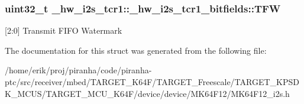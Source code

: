 \subsubsection[{\texorpdfstring{T\+FW}{TFW}}]{\setlength{\rightskip}{0pt plus 5cm}uint32\+\_\+t \+\_\+hw\+\_\+i2s\+\_\+tcr1\+::\+\_\+hw\+\_\+i2s\+\_\+tcr1\+\_\+bitfields\+::\+T\+FW}\hypertarget{struct__hw__i2s__tcr1_1_1__hw__i2s__tcr1__bitfields_a359dd879434cf79a67e83822231dbafa}{}\label{struct__hw__i2s__tcr1_1_1__hw__i2s__tcr1__bitfields_a359dd879434cf79a67e83822231dbafa}
\mbox{[}2\+:0\mbox{]} Transmit F\+I\+FO Watermark 

The documentation for this struct was generated from the following file\+:\begin{DoxyCompactItemize}
\item 
/home/erik/proj/piranha/code/piranha-\/ptc/src/receiver/mbed/\+T\+A\+R\+G\+E\+T\+\_\+\+K64\+F/\+T\+A\+R\+G\+E\+T\+\_\+\+Freescale/\+T\+A\+R\+G\+E\+T\+\_\+\+K\+P\+S\+D\+K\+\_\+\+M\+C\+U\+S/\+T\+A\+R\+G\+E\+T\+\_\+\+M\+C\+U\+\_\+\+K64\+F/device/device/\+M\+K64\+F12/M\+K64\+F12\+\_\+i2s.\+h\end{DoxyCompactItemize}
